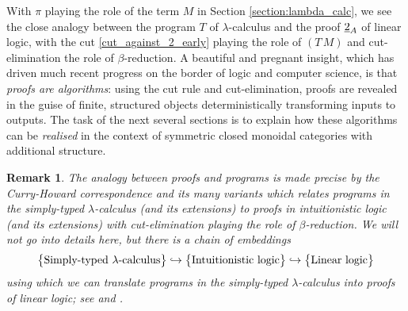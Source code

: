 \documentclass[english,letter paper,12pt,reqno]{article}
\theoremstyle{example}
\newtheorem{remark}[theorem]{Remark}
\numberwithin{equation}{section}
\def\inta{\bold{int}}
\begin{document}
With $\pi$ playing the role of the term $M$ in Section \ref{section:lambda_calc}, we see the close analogy between the program $T$ of $\lambda$-calculus and the proof $\underline{2}_A$ of linear logic, with the cut \eqref{cut_against_2_early} playing the role of $(T \, M)$ and cut-elimination the role of $\beta$-reduction. A beautiful and pregnant insight, which has driven much recent progress on the border of logic and computer science, is that \emph{proofs are algorithms}: using the cut rule and cut-elimination, proofs are revealed in the guise of finite, structured objects deterministically transforming inputs to outputs.
The task of the next several sections is to explain how these algorithms can be \emph{realised} in the context of symmetric closed monoidal categories with additional structure.

\begin{remark} The analogy between proofs and programs is made precise by the \emph{Curry-Howard correspondence} and its many variants \cite[\S 6.5]{selinger} which relates programs in the simply-typed $\lambda$-calculus (and its extensions) to proofs in intuitionistic logic (and its extensions) with cut-elimination playing the role of $\beta$-reduction. We will not go into details here, but there is a chain of embeddings
\[
\big\{\textup{Simply-typed $\lambda$-calculus}\big\} \hookrightarrow \big\{\textup{Intuitionistic logic}\big\} \hookrightarrow \big\{\textup{Linear logic}\big\}
\]
using which we can translate programs in the simply-typed $\lambda$-calculus into proofs of linear logic; see \cite[\S 5.1, \S 5.3]{girard_llogic} and \cite{lafont,abramsky,benton_etal}.
\end{remark}

\end{document}
